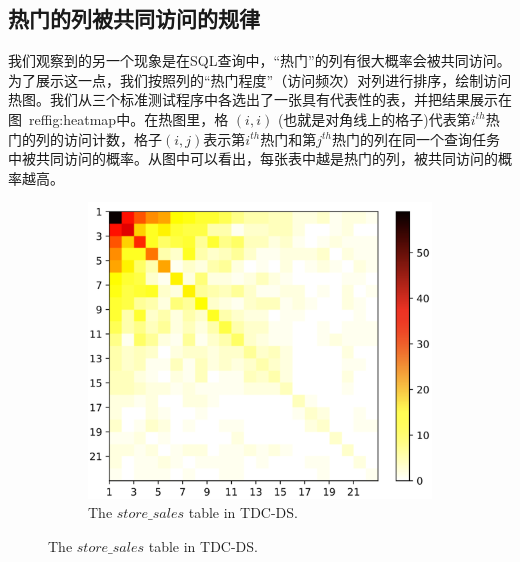 \subsection{热门的列被共同访问的规律}
我们观察到的另一个现象是在SQL查询中，“热门”的列有很大概率会被共同访问。为了展示这一点，我们按照列的“热门程度”（访问频次）对列进行排序，绘制访问热图。我们从三个标准测试程序中各选出了一张具有代表性的表，并把结果展示在图~ref{fig:heatmap}中。在热图里，格 $(i,i)$ (也就是对角线上的格子)代表第$i^{th}$热门的列的访问计数，格子$(i,j)$表示第$i^{th}$热门和第$j^{th}$热门的列在同一个查询任务中被共同访问的概率。从图中可以看出，每张表中越是热门的列，被共同访问的概率越高。

\begin{figure}[]
    \centering
    \begin{subfigure}[t]{0.5\textwidth}
        \centering
        \includegraphics[width=1\textwidth]{img/motivation/tpc-ds-store_sales}
        \caption{The $store\_sales$ table in TDC-DS.}
        \label{fig:ds_count_cdf}
    \end{subfigure}%


\end{figure}
